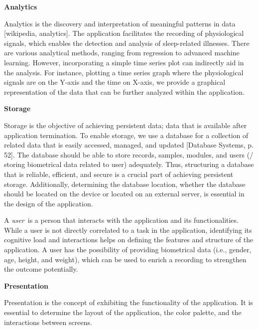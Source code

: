 \noindent \textbf{Analytics}

\noindent Analytics is the discovery and interpretation of meaningful patterns in data [wikipedia, analytics]. The application facilitates the recording of physiological signals, which enables the detection and analysis of sleep-related illnesses. There are various analytical methods, ranging from regression to advanced machine learning. However, incorporating a simple time series plot can indirectly aid in the analysis. For instance, plotting a time series graph where the physiological signals are on the Y-axis and the time on X-axis, we provide a graphical representation of the data that can be further analyzed within the application.

\noindent \textbf{Storage}

\noindent Storage is the objective of achieving persistent data; data that is available after application termination. To enable storage, we use a database for a collection of related data that is easily accessed, managed, and updated [Database Systems, p. 52]. The database should be able to store records, samples, modules, and users (/ storing biometrical data related to user) adequately. Thus, structuring a database that is reliable, efficient, and secure is a crucial part of achieving persistent storage. Additionally, determining the database location, whether the database should be located on the device or located on an external server, is essential in the design of the application.

\noindent A \textit{user} is a person that interacts with the application and its functionalities. While a user is not directly correlated to a task in the application, identifying its cognitive load and interactions helps on defining the features and structure of the application. A user has the possibility of providing biometrical data (i.e., gender, age, height, and weight), which can be used to enrich a recording to strengthen the outcome potentially.  

\noindent \textbf{Presentation}

\noindent Presentation is the concept of exhibiting the functionality of the application. It is essential to determine the layout of the application, the color palette, and the interactions between screens.  
